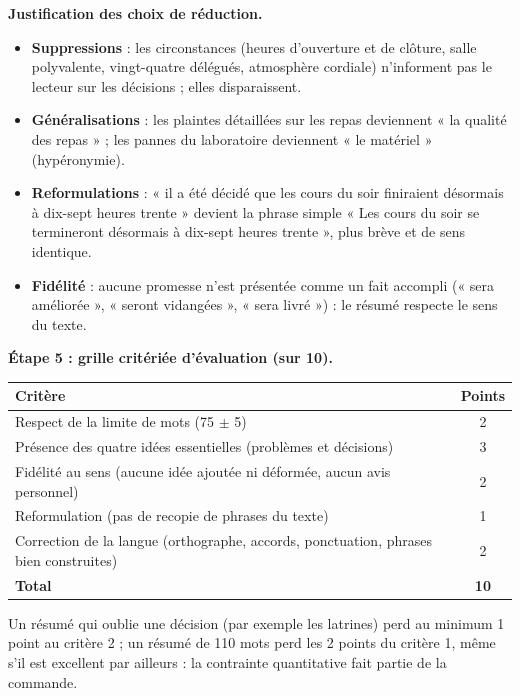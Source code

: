 \documentclass[11pt]{article}
\begin{document}
\begin{exoresolu}
\textbf{Justification des choix de réduction.}

\begin{itemize}
\item \textbf{Suppressions} : les circonstances (heures d'ouverture et de clôture, salle polyvalente, vingt-quatre délégués, atmosphère cordiale) n'informent pas le lecteur sur les décisions ; elles disparaissent.
\item \textbf{Généralisations} : les plaintes détaillées sur les repas deviennent « la qualité des repas » ; les pannes du laboratoire deviennent « le matériel » (hypéronymie).
\item \textbf{Reformulations} : « il a été décidé que les cours du soir finiraient désormais à dix-sept heures trente » devient la phrase simple « Les cours du soir se termineront désormais à dix-sept heures trente », plus brève et de sens identique.
\item \textbf{Fidélité} : aucune promesse n'est présentée comme un fait accompli (« sera améliorée », « seront vidangées », « sera livré ») : le résumé respecte le sens du texte.
\end{itemize}

\textbf{Étape 5 : grille critériée d'évaluation (sur 10).}

\begin{center}
\begin{tabularx}{\linewidth}{|X|c|}
\hline
\rowcolor{popgreenL} \textbf{Critère} & \textbf{Points} \\
\hline
Respect de la limite de mots (75 $\pm$ 5) & 2 \\
\hline
Présence des quatre idées essentielles (problèmes et décisions) & 3 \\
\hline
Fidélité au sens (aucune idée ajoutée ni déformée, aucun avis personnel) & 2 \\
\hline
Reformulation (pas de recopie de phrases du texte) & 1 \\
\hline
Correction de la langue (orthographe, accords, ponctuation, phrases bien construites) & 2 \\
\hline
\textbf{Total} & \textbf{10} \\
\hline
\end{tabularx}
\end{center}

Un résumé qui oublie une décision (par exemple les latrines) perd au minimum 1 point au critère 2 ; un résumé de 110 mots perd les 2 points du critère 1, même s'il est excellent par ailleurs : la contrainte quantitative fait partie de la commande.
\end{exoresolu}
\end{document}
